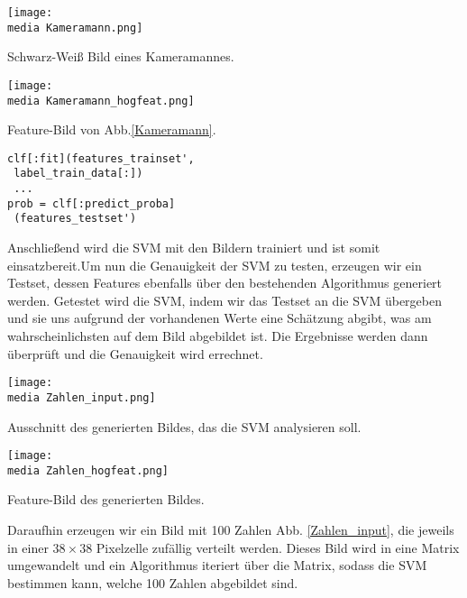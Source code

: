 \begin{dsafigure}
\begin{center}
	\texttt{[image: \\media Kameramann.png]}
	\caption{Schwarz-Weiß Bild eines Kameramannes.}
	\label{Kameramann}
\end{center}
\end{dsafigure}

\begin{dsafigure}
\begin{center}
	\texttt{[image: \\media Kameramann\_hogfeat.png]}
	\caption{Feature-Bild von Abb.\ref{Kameramann}.}
	\label{Kameramann_hogfeat}
\end{center}
\end{dsafigure}

\begin{verbatim}
clf[:fit](features_trainset', 
 label_train_data[:])
 ...
prob = clf[:predict_proba]
 (features_testset')
\end{verbatim}

Anschließend wird die SVM mit den Bildern trainiert und ist somit einsatzbereit.Um nun die Genauigkeit der SVM zu testen, erzeugen wir ein Testset, dessen Features ebenfalls über den bestehenden Algorithmus generiert werden. Getestet wird die SVM, indem wir das Testset an die SVM übergeben und sie uns aufgrund der vorhandenen Werte eine Schätzung abgibt, was am wahrscheinlichsten auf dem Bild abgebildet ist. Die Ergebnisse werden dann überprüft und die Genauigkeit wird errechnet.

\begin{dsafigure}
\begin{center}
	\texttt{[image: \\media Zahlen\_input.png]}
	\caption{Ausschnitt des generierten Bildes, das die SVM analysieren soll.}
	\label{Zahlen_input}
\end{center}
\end{dsafigure}

\begin{dsafigure}
\begin{center}
	\texttt{[image: \\media Zahlen\_hogfeat.png]}
	\caption{Feature-Bild des generierten Bildes.}
	\label{Zahlen_hogfeat}
\end{center}
\end{dsafigure}

Daraufhin erzeugen wir ein Bild mit 100 Zahlen Abb. \ref{Zahlen_input}, die jeweils in einer $38 \times 38$ Pixelzelle zufällig verteilt werden. Dieses Bild wird in eine Matrix umgewandelt und ein Algorithmus iteriert über die Matrix, sodass die SVM bestimmen kann, welche 100 Zahlen abgebildet sind.



